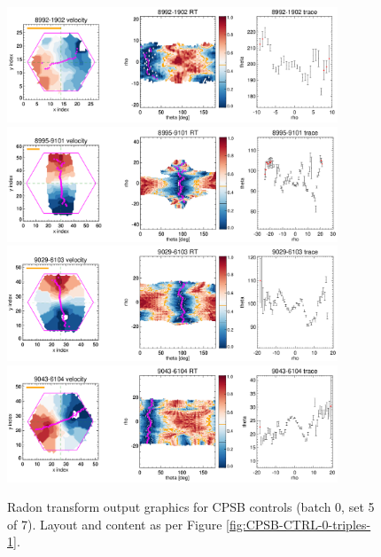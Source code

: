 \documentclass[fleqn,usenatbib]{mnras}
\begin{document}
\begin{figure}
    \centering
    \includegraphics[width=0.88\textwidth]{Images/SN1-MC250/CPSB-CTRL-triples/CPSB-CTRL-8992-1902-1-250.png}
    \includegraphics[width=0.88\textwidth]{Images/SN1-MC250/CPSB-CTRL-triples/CPSB-CTRL-8995-9101-1-250.png}
    \includegraphics[width=0.88\textwidth]{Images/SN1-MC250/CPSB-CTRL-triples/CPSB-CTRL-9029-6103-1-250.png}
    \includegraphics[width=0.88\textwidth]{Images/SN1-MC250/CPSB-CTRL-triples/CPSB-CTRL-9043-6104-1-250.png}    
    \caption{Radon transform output graphics for CPSB controls (batch 0, set 5 of 7). Layout and content as per Figure \ref{fig:CPSB-CTRL-0-triples-1}.}
    \label{fig:CPSB-CTRL-0-triples-5}
\end{figure}
\end{document}
